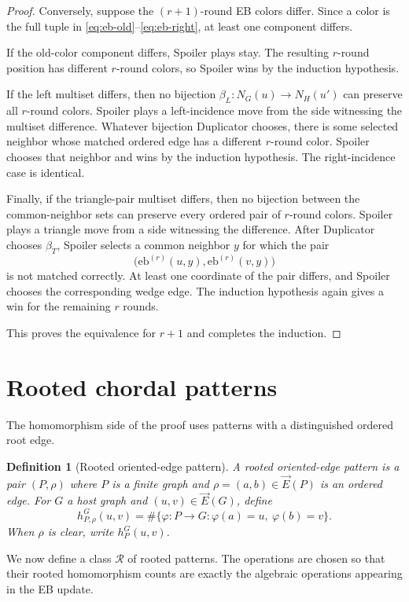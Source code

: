 \documentclass[11pt]{article}
\newtheorem{definition}[theorem]{Definition}
\newcommand{\cR}{\mathcal{R}}
\newcommand{\vecE}{\overrightarrow{E}}
\begin{document}
\begin{proof}
Conversely, suppose the $(r+1)$-round EB colors differ.  Since a color is the full tuple in \eqref{eq:eb-old}--\eqref{eq:eb-right}, at least one component differs.

If the old-color component differs, Spoiler plays stay.  The resulting $r$-round position has different $r$-round colors, so Spoiler wins by the induction hypothesis.

If the left multiset differs, then no bijection $\beta_L:N_G(u)\to N_H(u')$ can preserve all $r$-round colors.  Spoiler plays a left-incidence move from the side witnessing the multiset difference.  Whatever bijection Duplicator chooses, there is some selected neighbor whose matched ordered edge has a different $r$-round color.  Spoiler chooses that neighbor and wins by the induction hypothesis.  The right-incidence case is identical.

Finally, if the triangle-pair multiset differs, then no bijection between the common-neighbor sets can preserve every ordered pair of $r$-round colors.  Spoiler plays a triangle move from a side witnessing the difference.  After Duplicator chooses $\beta_T$, Spoiler selects a common neighbor $y$ for which the pair
\[
\bigl(\mathrm{eb}^{(r)}(u,y),\mathrm{eb}^{(r)}(v,y)\bigr)
\]
is not matched correctly.  At least one coordinate of the pair differs, and Spoiler chooses the corresponding wedge edge.  The induction hypothesis again gives a win for the remaining $r$ rounds.

This proves the equivalence for $r+1$ and completes the induction.
\end{proof}

\section{Rooted chordal patterns}
\label{sec:rooted-patterns}

The homomorphism side of the proof uses patterns with a distinguished ordered root edge.

\begin{definition}[Rooted oriented-edge pattern]
A rooted oriented-edge pattern is a pair $(P,\rho)$ where $P$ is a finite graph and $\rho=(a,b)\in\vecE(P)$ is an ordered edge.  For $G$ a host graph and $(u,v)\in\vecE(G)$, define
\[
h_{P,\rho}^G(u,v)
=
\#\{\varphi:P\to G:\varphi(a)=u,\ \varphi(b)=v\}.
\]
When $\rho$ is clear, write $h_P^G(u,v)$.
\end{definition}

We now define a class $\cR$ of rooted patterns.  The operations are chosen so that their rooted homomorphism counts are exactly the algebraic operations appearing in the EB update.
\end{document}
